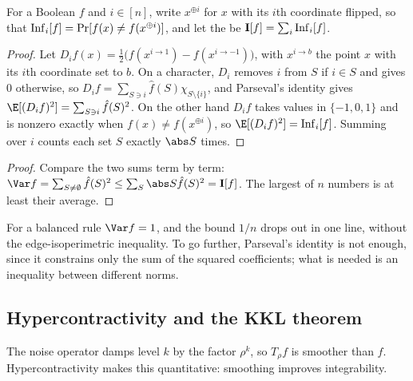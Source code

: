 \begin{refsection}
For a Boolean $f$ and $i\in[n]$, write $x^{\oplus i}$ for $x$ with its $i$th coordinate flipped, so that $\operatorname{Inf}_i[f]=\Pr[f(x)\ne f(x^{\oplus i})]$, and let the  be $\mathbf{I}[f]=\sum_i\operatorname{Inf}_i[f]$.


\begin{proof}
Let $D_if(x)=\frac12\bigl(f(x^{i\to1})-f(x^{i\to-1})\bigr)$, with $x^{i\to b}$ the point $x$ with its $i$th coordinate set to $b$. On a character, $D_i$ removes $i$ from $S$ if $i\in S$ and gives $0$ otherwise, so $D_if=\sum_{S\ni i}\hat f(S)\chi_{S\setminus\{i\}}$, and Parseval's identity gives $\E[(D_if)^2]=\sum_{S\ni i}\hat f(S)^2$. On the other hand $D_if$ takes values in $\{-1,0,1\}$ and is nonzero exactly when $f(x)\ne f(x^{\oplus i})$, so $\E[(D_if)^2]=\fourierInf_i[f]$. Summing over $i$ counts each set $S$ exactly $\abs S$ times.
\end{proof}


\begin{proof}
Compare the two sums term by term: $\Var f=\sum_{S\ne\emptyset}\hat f(S)^2\le\sum_S\abs S\hat f(S)^2=\fourierTI[f]$. The largest of $n$ numbers is at least their average.
\end{proof}

For a balanced rule $\Var f=1$, and the bound $1/n$ drops out in one line, without the edge-isoperimetric inequality. To go further, Parseval's identity is not enough, since it constrains only the sum of the squared coefficients; what is needed is an inequality between different norms.

\subsection{Hypercontractivity and the KKL theorem}\label{sec:fourier:kkl}

The noise operator damps level $k$ by the factor $\rho^k$, so $T_\rho f$ is smoother than $f$. Hypercontractivity makes this quantitative: smoothing improves integrability.


\end{refsection}
